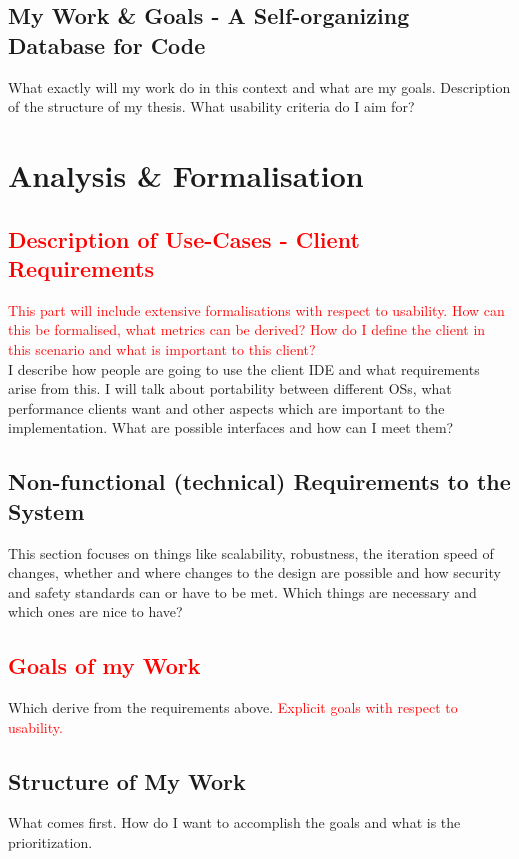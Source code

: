 \documentclass[12p]{scrartcl}
\begin{document}
\subsection{My Work \& Goals - A Self-organizing Database for Code}
What exactly will my work do in this context and what are my goals. 
Description of the structure of my thesis. What usability criteria do I aim for?\\






\section{Analysis \& Formalisation}

\subsection{\textcolor{red}{Description of Use-Cases - Client Requirements}}
\textcolor{red}{This part will include extensive formalisations with respect to usability. How can this be formalised, what metrics can be derived? How do I define the client in this scenario and what is important to this client?}\\
I describe how people are going to use the client IDE and what requirements arise from this. I will talk about portability between different OSs, what performance clients want and other aspects which are important to the implementation. What are possible interfaces and how can I meet them?
\subsection{Non-functional (technical) Requirements to the System}
This section focuses on things like scalability, robustness, the iteration speed of changes, whether and where changes to the design are possible and how security and safety standards can or have to be met. Which things are necessary and which ones are nice to have?
\subsection{\textcolor{red}{Goals of my Work}}
Which derive from the requirements above. \textcolor{red}{Explicit goals with respect to usability.}
\subsection{Structure of My Work}
What comes first. How do I want to accomplish the goals and what is the prioritization.
\end{document}
